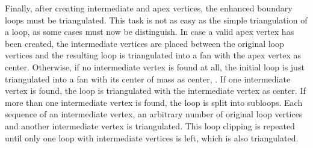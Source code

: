 Finally, after creating intermediate and apex vertices, the enhanced boundary loops must be triangulated.
This task is not as easy as the simple triangulation of a loop, as some cases must now be distinguish.
In case a valid apex vertex has been created, the intermediate vertices are placed between the original loop vertices and the resulting loop is triangulated into a fan with the apex vertex as center.
Otherwise, if no intermediate vertex is found at all, the initial loop is just triangulated into a fan with its center of mass as center, \cf {}.
If one intermediate vertex is found, the loop is triangulated with the intermediate vertex as center.
If more than one intermediate vertex is found, the loop is split into subloops.
Each sequence of an intermediate vertex, an arbitrary number of original loop vertices and another intermediate vertex is triangulated.
This loop clipping is repeated until only one loop with intermediate vertices is left, which is also triangulated.

